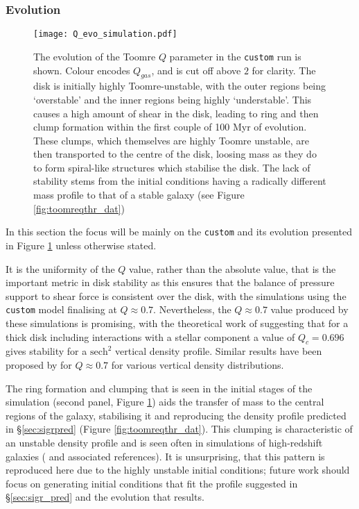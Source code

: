 \subsubsection{Evolution}

\begin{figure}[!ht]
    \texttt{[image: Q\_evo\_simulation.pdf]}
    \caption{The evolution of the Toomre $Q$ parameter in the {\tt custom} run is shown. Colour encodes $Q_{gas}$, and is cut off above $2$ for clarity. The disk is initially highly Toomre-unstable, with the outer regions being `overstable' and the inner regions being highly `understable'. This causes a high amount of shear in the disk, leading to ring and then clump formation within the first couple of 100 Myr of evolution. These clumps, which themselves are highly Toomre unstable, are then transported to the centre of the disk, loosing mass as they do to form spiral-like structures which stabilise the disk. The lack of stability stems from the initial conditions having a radically different mass profile to that of a stable galaxy (see Figure \ref{fig:toomreqthr_dat})}
    \label{fig:toomqsimsmallfig}
\end{figure}

In this section the focus will be mainly on the {\tt custom} and its evolution presented in Figure \ref{fig:toomqsimsmallfig} unless otherwise stated.

It is the uniformity of the $Q$ value, rather than the absolute value, that is the important metric in disk stability as this ensures that the balance of pressure support to shear force is consistent over the disk, with the simulations using the {\tt custom} model finalising at $Q \approx 0.7$.
Nevertheless, the $Q\approx 0.7$ value produced by these simulations is promising, with the theoretical work of \citet{behrendt_structure_2015} suggesting that for a thick disk including interactions with a stellar component a value of $Q_c = 0.696$ gives stability for a $\mathrm{sech}^2$ vertical density profile.
Similar results have been proposed by \citet{kim_three-dimensional_2002, wang_equilibrium_2010} for $Q \approx 0.7$ for various vertical density distributions.

The ring formation and clumping that is seen in the initial stages of the simulation (second panel, Figure \ref{fig:toomqsimsmallfig}) aids the transfer of mass to the central regions of the galaxy, stabilising it and reproducing the density profile predicted in \S\ref{sec:sigrpred} (Figure \ref{fig:toomreqthr_dat}).
This clumping is characteristic of an unstable density profile and is seen often in simulations of high-redshift galaxies (\citet{bournaud_bulge_2016} and associated references).
It is unsurprising, that this pattern is reproduced here due to the highly unstable initial conditions; future work should focus on generating initial conditions that fit the profile suggested in \S \ref{sec:sigr_pred} and the evolution that results.

